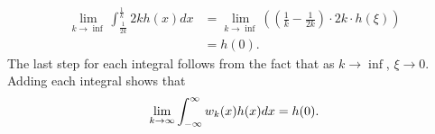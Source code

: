 \begin{example}
    \begin{equation*}
        \begin{split}
            \lim_{k\to \inf}\int_{\frac{1}{2k}}^{\frac{1}{k}} 2kh(x)dx &= \lim_{k\to \inf}  \left( \left(\frac{1}{k} - \frac{1}{2k}\right) \cdot 2k\cdot h(\xi)\right) \\
            &=h(0).
        \end{split}
    \end{equation*}
    The last step for each integral follows from the fact that as \(k \to \inf\), \(\xi\to 0\). Adding each integral shows that
    \begin{equation*}
        \lim_{k\to \infty}\int_{-\infty}^{\infty} w_k(x) h(x) dx = h(0).
    \end{equation*}
\end{example}
